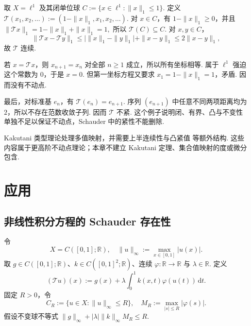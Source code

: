 \begin{FACounterexample}[缺紧性时不动点可失效]\label{iii03:no-compact-fixed-point}
取 \(\displaystyle X=\ell^1\) 及其闭单位球
\(\displaystyle C:=\{x\in\ell^1:\|x\|_1\leqslant1\}.\)
定义
\(\displaystyle \mathcal T(x_1,x_2,\dots) := (1-\|x\|_1,x_1,x_2,\dots).\)
对 \(\displaystyle x\in C\)，有 \(\displaystyle1-\|x\|_1\geqslant0\)，并且
\(\displaystyle \|\mathcal T x\|_1 = 1-\|x\|_1+\|x\|_1 = 1,\)
所以 \(\displaystyle \mathcal T(C)\subseteq C\). 对 \(\displaystyle x,y\in C\)，
\[
\|\mathcal T x-\mathcal T y\|_1
\leqslant
\bigl|\|x\|_1-\|y\|_1\bigr|+\|x-y\|_1
\leqslant
2\|x-y\|_1,
\]
故 \(\displaystyle \mathcal T\) 连续.

若 \(\displaystyle x=\mathcal T x\)，则 \(\displaystyle x_{n+1}=x_n\) 对全部 \(\displaystyle n\geqslant1\) 成立，所以所有坐标相等. 属于 \(\displaystyle \ell^1\) 强迫这个常数为 \(\displaystyle0\)，于是 \(\displaystyle x=0\). 但第一坐标方程又要求 \(\displaystyle x_1=1-\|x\|_1=1\)，矛盾. 因而没有不动点.

最后，对标准基 \(\displaystyle e_n\)，有 \(\displaystyle \mathcal T(e_n)=e_{n+1}\). 序列 \(\displaystyle (e_{n+1})\) 中任意不同两项距离均为 \(\displaystyle2\)，所以不存在范数收敛子列. 因而 \(\displaystyle \mathcal T\) 不紧. 这个例子说明闭、有界、凸与不变性单独不足以保证不动点，Schauder 中的紧性不能删除.
\end{FACounterexample}

\begin{FARemark}[Kakutani 边界]
Kakutani 类型理论处理多值映射，并需要上半连续性与凸紧值 等额外结构. 这些内容属于更高阶不动点理论；本章不建立 Kakutani 定理、集合值映射的度或微分包含.
\end{FARemark}

\section{应用}\label{sec:iii03-applications}

\subsection{非线性积分方程的 Schauder 存在性}

令
\[
X=C([0,1];\mathbb R),
\quad
\|u\|_\infty:=\max_{x\in[0,1]}|u(x)|.
\]
取 \(\displaystyle g\in C([0,1];\mathbb R)\)、\(\displaystyle k\in C([0,1]^2;\mathbb R)\)、连续 \(\displaystyle \varphi:\mathbb R\to\mathbb R\) 与 \(\displaystyle \lambda\in\mathbb R\). 定义
\[
(\mathcal T u)(x)
:=
g(x)
+
\lambda\int_0^1k(x,t)\varphi(u(t))\,\mathrm{d}t.
\]
固定 \(\displaystyle R>0\)，令
\[
C_R:=\{u\in X:\|u\|_\infty\leqslant R\},
\quad
M_R:=\max_{|s|\leqslant R}|\varphi(s)|.
\]
假设不变球不等式
\(\displaystyle \|g\|_\infty + |\lambda|\|k\|_\infty M_R \leqslant R.\)


